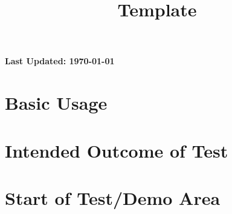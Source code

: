 \title{Template}


\begin{abstract}
    
\end{abstract}
\maketitle

{{\Huge \bfseries Last Updated: \today}} \\


\section{Basic Usage}


\section{Intended Outcome of Test}


\section{Start of Test/Demo Area}


\hrulefill




